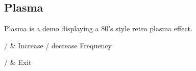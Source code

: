 \subsection{Plasma}
Plasma is a demo displaying a 80's style retro plasma effect.

\begin{btnmap}
    \PluginUp{} / \PluginDown
    & Increase / decrease Frequency\\


    \PluginCancel{} / \PluginExit
    & Exit\\
\end{btnmap}
